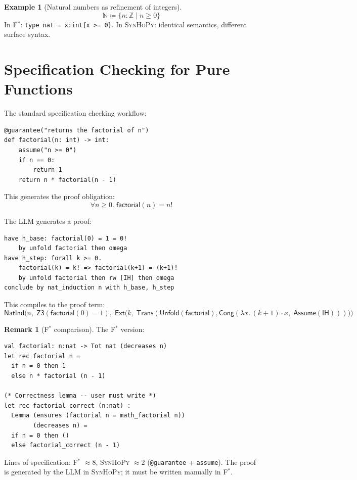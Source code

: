 \documentclass[11pt,a4paper]{report}
\theoremstyle{definition}
\newtheorem{example}[definition]{Example}
\newtheorem{remark}[definition]{Remark}
\theoremstyle{plain}
\newcommand{\Nat}{\mathbb{N}}
\newcommand{\Int}{\mathbb{Z}}
\newcommand{\Ext}{\mathsf{Ext}}
\newcommand{\Assume}{\mathsf{Assume}}
\newcommand{\Trans}{\mathsf{Trans}}
\newcommand{\Cong}{\mathsf{Cong}}
\newcommand{\defeq}{\coloneqq}
\newcommand{\fstar}{F$^{*}$}
\newcommand{\synhopy}{\textsc{SynHoPy}}
\begin{document}
\begin{example}[Natural numbers as refinement of integers]
\[
  \Nat \defeq \{n : \Int \mid n \geq 0\}
\]
In \fstar{}: \lstinline[style=fstar]|type nat = x:int{x >= 0}|.
In \synhopy{}: identical semantics, different surface syntax.
\end{example}

\section{Specification Checking for Pure Functions}

The standard specification checking workflow:

\begin{lstlisting}[style=synhopy]
@guarantee("returns the factorial of n")
def factorial(n: int) -> int:
    assume("n >= 0")
    if n == 0:
        return 1
    return n * factorial(n - 1)
\end{lstlisting}

This generates the proof obligation:
\[
  \forall n \geq 0.\; \mathsf{factorial}(n) = n!
\]

The LLM generates a proof:
\begin{lstlisting}[style=proof]
have h_base: factorial(0) = 1 = 0!
    by unfold factorial then omega
have h_step: forall k >= 0.
    factorial(k) = k! => factorial(k+1) = (k+1)!
    by unfold factorial then rw [IH] then omega
conclude by nat_induction n with h_base, h_step
\end{lstlisting}

This compiles to the proof term:
\[
  \mathsf{NatInd}\Big(n,\;
    \mathsf{Z3}(\mathsf{factorial}(0) = 1),\;
    \Ext\big(k,\;
      \Trans(\mathsf{Unfold}(\mathsf{factorial}),
             \Cong(\lambda x.\, (k+1) \cdot x,\; \Assume(\mathsf{IH})))
    \big)
  \Big)
\]

\begin{remark}[\fstar{} comparison]
The \fstar{} version:
\begin{lstlisting}[style=fstar]
val factorial: n:nat -> Tot nat (decreases n)
let rec factorial n =
  if n = 0 then 1
  else n * factorial (n - 1)

(* Correctness lemma -- user must write *)
let rec factorial_correct (n:nat) :
  Lemma (ensures (factorial n = math_factorial n))
        (decreases n) =
  if n = 0 then ()
  else factorial_correct (n - 1)
\end{lstlisting}
Lines of specification: \fstar{} $\approx 8$, \synhopy{} $\approx 2$ (\texttt{@guarantee} +
\texttt{assume}). The proof is generated by the LLM in \synhopy{}; it must be
written manually in \fstar{}.
\end{remark}
\end{document}

